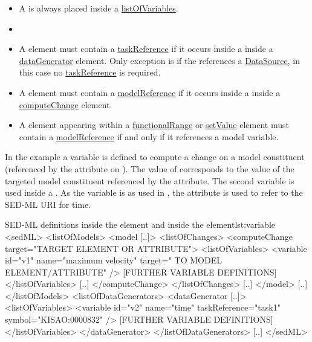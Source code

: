 \begin{itemize}
	\item A \Variable is always placed inside a \hyperref[class:listOfVariables]{listOfVariables}.  
	\item {}
	\item A \Variable element must contain a \hyperref[sec:taskReference]{taskReference} if it occurs inside a \hyperref[class:listOfVariables]{} inside a \hyperref[class:dataGenerator]{dataGenerator} element. Only exception is if the \Variable references a \hyperref[class:dataSource]{DataSource}, in this case no \hyperref[sec:taskReference]{taskReference} is required.
	\item A \Variable element must contain a \hyperref[sec:modelReference]{modelReference} if it occurs inside a \hyperref[class:listOfVariables]{} inside a \hyperref[class:computeChange]{computeChange} element.
	\item A \Variable  element appearing within a \hyperref[class:functionalRange]{functionalRange} or \hyperref[class:setValue]{setValue} element must contain a \hyperref[sec:modelReference]{modelReference} if and only if it references a model variable.
\end{itemize}

In the example a variable  is defined to compute a change on a model constituent (referenced by the \hyperref[sec:target]{} attribute on \hyperref[class:computeChange]{}). The value of  corresponds to the value of the targeted model constituent referenced by the  attribute. The second variable  is used inside a \hyperref[class:dataGenerator]{}. As the variable is  as used in , the \hyperref[sec:symbol]{} attribute is used to refer to the SED-ML URI for time.

\begin{myXmlLst}{SED-ML  definitions inside the  element and inside the  element}{lst:variable}
<sedML>
	<listOfModels>
		<model [..]>
			<listOfChanges>
				<computeChange target="TARGET ELEMENT OR ATTRIBUTE">
				<listOfVariables>
				   <variable id="v1" name="maximum velocity" target=" TO MODEL ELEMENT/ATTRIBUTE" />
				   [FURTHER VARIABLE DEFINITIONS]
				</listOfVariables>
				[..]
				</computeChange>
			</listOfChanges>
			[..]
		</model>
		[..]
	</listOfModels>
	<listOfDataGenerators>
		<dataGenerator [..]>
			<listOfVariables>
				<variable id="v2" name="time" taskReference="task1" symbol="KISAO:0000832" />
				[FURTHER VARIABLE DEFINITIONS]
			</listOfVariables>
		</dataGenerator>
	</listOfDataGenerators>
	[..]
</sedML>
\end{myXmlLst}


